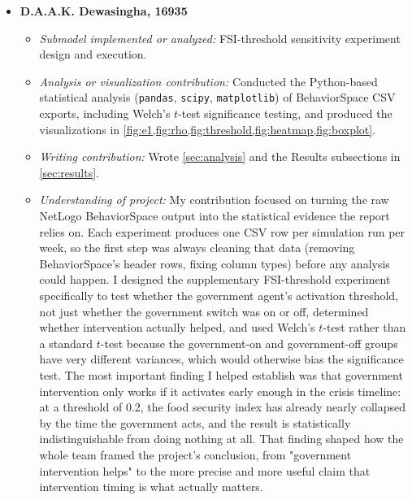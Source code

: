 \documentclass[final,onefignum,onetabnum]{siuro250211}
\begin{document}
\begin{itemize}[leftmargin=.3in]
\item[] \textbf{D.A.A.K. Dewasingha, 16935}
\begin{itemize}
\item \textit{Submodel implemented or analyzed:} FSI-threshold sensitivity experiment design and
execution.
\item \textit{Analysis or visualization contribution:} Conducted the Python-based statistical
analysis (\texttt{pandas}, \texttt{scipy}, \texttt{matplotlib}) of BehaviorSpace CSV exports,
including Welch's $t$-test significance testing, and produced the visualizations in
\cref{fig:e1,fig:rho,fig:threshold,fig:heatmap,fig:boxplot}.
\item \textit{Writing contribution:} Wrote \cref{sec:analysis} and the Results subsections in
\cref{sec:results}.
\item \textit{Understanding of project:} My contribution focused on turning the raw NetLogo
BehaviorSpace output into the statistical evidence the report relies on. Each experiment produces
one CSV row per simulation run per week, so the first step was always cleaning that data (removing
BehaviorSpace's header rows, fixing column types) before any analysis could happen. I designed the
supplementary FSI-threshold experiment specifically to test whether the government agent's
activation threshold, not just whether the government switch was on or off, determined whether
intervention actually helped, and used Welch's $t$-test rather than a standard $t$-test because the
government-on and government-off groups have very different variances, which would otherwise bias
the significance test. The most important finding I helped establish was that government
intervention only works if it activates early enough in the crisis timeline: at a threshold of
0.2, the food security index has already nearly collapsed by the time the government acts, and the
result is statistically indistinguishable from doing nothing at all. That finding shaped how the
whole team framed the project's conclusion, from "government intervention helps" to the more
precise and more useful claim that intervention timing is what actually matters.
\end{itemize}


\end{itemize}
\end{document}
